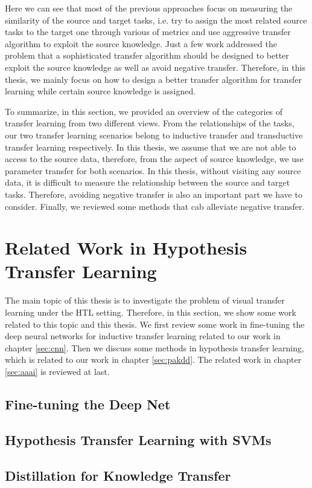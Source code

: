 Here we can see that most of the previous approaches focus on measuring the similarity of the source and target tasks, i.e. try to assign the most related source tasks to the target one through various of metrics and use aggressive transfer algorithm to exploit the source knowledge. Just a few work \cite{kuzborskij2013stability} \cite{tommasi2010safety} addressed the problem that a sophisticated transfer algorithm should be designed to better exploit the source knowledge as well as avoid negative transfer. Therefore, in this thesis, we mainly focus on how to design a better transfer algorithm for transfer learning while certain source knowledge is assigned. 

To summarize, in this section, we provided an overview of the categories of transfer learning from two different views. From the relationships of the tasks, our two transfer learning scenarios belong to inductive transfer and transductive transfer learning respectively. In this thesis, we assume that we are not able to access to the source data, therefore, from the aspect of source knowledge, we use parameter transfer for both scenarios. In this thesis, without visiting any source data, it is difficult to measure the relationship between the source and target tasks. Therefore, avoiding negative transfer is also an important part we have to consider. Finally, we reviewed some methods that cab alleviate negative transfer.

\section{Related Work in Hypothesis Transfer Learning}
The main topic of this thesis is to investigate the problem of visual transfer learning under the HTL setting. Therefore, in this section, we show some work related to this topic and this thesis. We first review some work in fine-tuning the deep neural networks for inductive transfer learning related to our work in chapter \ref{sec:cnn}. Then we discuss some methods in hypothesis transfer learning, which is related to our work in chapter \ref{sec:pakdd}. The related work in chapter \ref{sec:aaai} is reviewed at last.

\subsection{Fine-tuning the Deep Net}


\subsection{Hypothesis Transfer Learning with SVMs}


\subsection{Distillation for Knowledge Transfer}




